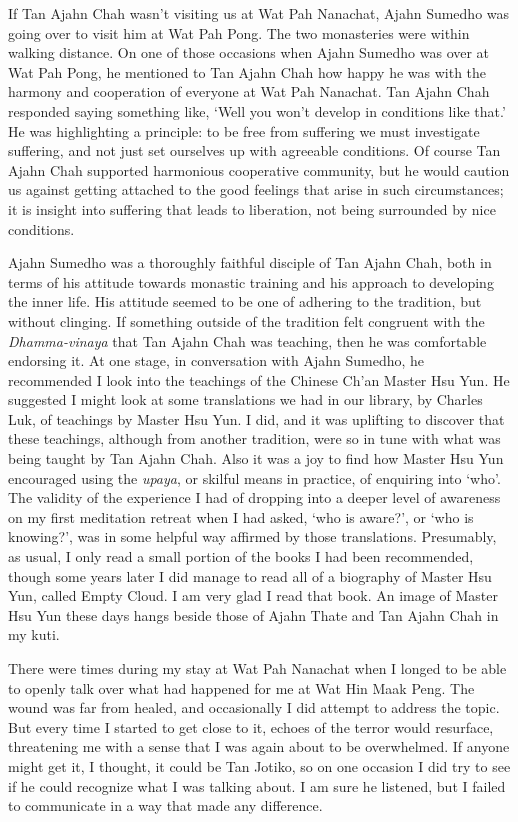 If Tan Ajahn Chah wasn't visiting us at Wat Pah Nanachat, Ajahn Sumedho
was going over to visit him at Wat Pah Pong. The two monasteries were
within walking distance. On one of those occasions when Ajahn Sumedho
was over at Wat Pah Pong, he mentioned to Tan Ajahn Chah how happy he
was with the harmony and cooperation of everyone at Wat Pah Nanachat.
Tan Ajahn Chah responded saying something like, `Well you won't develop
in conditions like that.' He was highlighting a principle: to be free
from suffering we must investigate suffering, and not just set ourselves
up with agreeable conditions. Of course Tan Ajahn Chah supported
harmonious cooperative community, but he would caution us against
getting attached to the good feelings that arise in such circumstances;
it is insight into suffering that leads to liberation, not being
surrounded by nice conditions.

Ajahn Sumedho was a thoroughly faithful disciple of Tan Ajahn Chah, both
in terms of his attitude towards monastic training and his approach to
developing the inner life. His attitude seemed to be one of adhering to
the tradition, but without clinging. If something outside of the
tradition felt congruent with the \emph{Dhamma-vinaya} that Tan Ajahn
Chah was teaching, then he was comfortable endorsing it. At one stage,
in conversation with Ajahn Sumedho, he recommended I look into the
teachings of the Chinese Ch'an Master Hsu Yun\cite{hsu-yun}.
He suggested I might look at some translations we had in our library, by
Charles Luk, of teachings by Master Hsu Yun. I did, and it was uplifting
to discover that these teachings, although from another tradition, were
so in tune with what was being taught by Tan Ajahn Chah. Also it was a
joy to find how Master Hsu Yun encouraged using the \emph{upaya}, or
skilful means in practice, of enquiring into `who'. The validity of the
experience I had of dropping into a deeper level of awareness on my
first meditation retreat when I had asked, `who is aware?', or `who is
knowing?', was in some helpful way affirmed by those translations.
Presumably, as usual, I only read a small portion of the books I had
been recommended, though some years later I did manage to read all of a
biography of Master Hsu Yun, called Empty Cloud\cite{hsu-yun-bio}.
I am very glad I read that book. An image of Master Hsu Yun
these days hangs beside those of Ajahn Thate and Tan Ajahn
Chah in my kuti.

There were times during my stay at Wat Pah Nanachat when I longed to be
able to openly talk over what had happened for me at Wat Hin Maak Peng.
The wound was far from healed, and occasionally I did attempt to address
the topic. But every time I started to get close to it, echoes of the
terror would resurface, threatening me with a sense that I was again
about to be overwhelmed. If anyone might get it, I thought, it could be
Tan Jotiko, so on one occasion I did try to see if he could recognize
what I was talking about. I am sure he listened, but I failed to
communicate in a way that made any difference.

